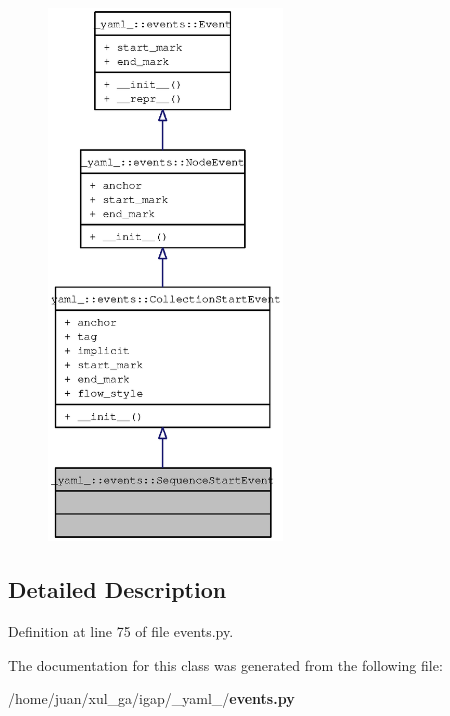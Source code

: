 \begin{figure}[H]
\begin{center}
\leavevmode
\includegraphics[height=400pt]{class__yaml___1_1events_1_1SequenceStartEvent__coll__graph}
\end{center}
\end{figure}


\subsection{Detailed Description}


Definition at line 75 of file events.py.

The documentation for this class was generated from the following file:\begin{CompactItemize}
\item 
/home/juan/xul\_\-ga/igap/\_\-yaml\_\-/{\bf events.py}\end{CompactItemize}
